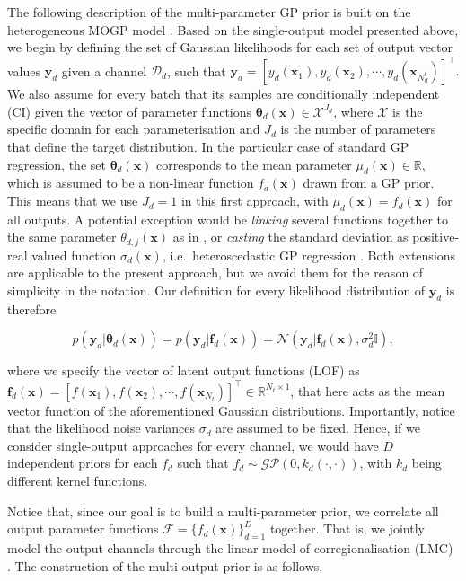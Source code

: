 \documentclass[]{article}
\def\f{{\mathbf f}}
\newcommand{\Fcal}{\mathcal{F}}
\newcommand{\Ncal}{\mathcal{N}}
\newcommand{\Dcal}{\mathcal{D}}
\newcommand{\Xcal}{\mathcal{X}}
\newcommand{\xc}{\bm{x}}
\newcommand{\yc}{\bm{y}}
\begin{document}
The following description of the multi-parameter GP prior is built on the heterogeneous MOGP model \citep{morenomunoz2018}. Based on the single-output model presented above, we begin by defining the set of Gaussian likelihoods for each set of output vector values $\yc_d$ given a channel $\Dcal_d$,  such that $\yc_d = [y_d(\xc_1),y_d(\xc_2), \cdots, y_d(\xc_{N^{t}_d})]^\top.$ We also assume for every batch that its samples are conditionally independent (CI) given the vector of parameter functions $\bm{\theta}_d(\xc)\in \Xcal^{J_d} $, where $\Xcal$ is the specific domain for each parameterisation and $J_d$ is the number of parameters that define the target distribution. In the particular case of standard GP regression,  the set $\bm{\theta}_d(\xc)$ corresponds to the mean parameter $\mu_d(\xc) \in \mathbb{R}$, which is assumed to be a non-linear function $f_d(\xc)$ drawn from a GP prior. This means that we use $J_d = 1$ in this first approach, with $\mu_d(\xc) = f_d(\xc)$ for all outputs. A potential exception would be \textit{linking} several functions together to the same parameter $\theta_{d,j}(\xc)$ as in \citet{saul2016chained}, or \textit{casting} the standard deviation as positive-real valued function $\sigma_d(\xc)$, i.e.\ heteroscedastic GP regression \citep{lazaro2011variational}. Both extensions are applicable to the present approach, but we avoid them for the reason of simplicity in the notation. Our definition for every likelihood distribution of $\yc_d$ is therefore

\begin{equation}
	\label{eq:mo_likelihood}
	p(\yc_d|\bm{\theta}_d(\xc)) = p(\yc_d|\f_d(\xc)) = \Ncal(\yc_d|\f_d(\xc), \sigma^2_d\mathbb{I}),
\end{equation}

where we specify the vector of latent output functions (LOF) as $\f_d(\xc) = [f(\xc_1), f(\xc_2), \cdots, f(\xc_{N_t})]^\top\in \mathbb{R}^{N_t\times 1}$, that here acts as the mean vector function of the aforementioned Gaussian distributions. Importantly, notice that the likelihood noise variances $\sigma_d$ are assumed to be fixed. Hence, if we consider single-output approaches for every channel, we would have $D$ independent priors for each $f_d$ such that $f_d \sim \mathcal{GP}(0,k_d(\cdot,\cdot))$, with $k_d$ being different kernel functions. 

Notice that, since our goal is to build a multi-parameter prior, we correlate all output parameter functions $\Fcal = \{f_d(\xc)\}^D_{d=1}$ together. That is, we jointly model the output channels through the linear model of corregionalisation (LMC) \citep{journel1978mining}. The construction of the multi-output prior is as follows.
\end{document}
